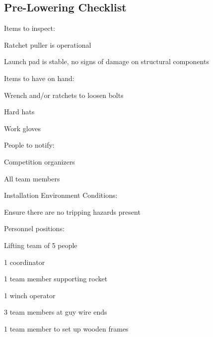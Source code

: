 \subsection{Pre-Lowering Checklist}
\begin{checklist}

\item Items to inspect:
\begin{checklist}
\item Ratchet puller is operational
\item Launch pad is stable, no signs of damage on structural components
\end{checklist}

\item Items to have on hand:
\begin{checklist}
\item Wrench and/or ratchets to loosen bolts
\item Hard hats
\item Work gloves
\end{checklist}

\item People to notify:
\begin{checklist}
\item Competition organizers
\item All team members
\end{checklist}

\item Installation Environment Conditions:
\begin{checklist}
\item Ensure there are no tripping hazards present
\end{checklist}

\item Personnel positions:
\begin{checklist}
\item Lifting team of 5 people
\item 1 coordinator
\item 1 team member supporting rocket
\item 1 winch operator
\item 3 team members at guy wire ends
\item 1 team member to set up wooden frames
\end{checklist}

\end{checklist}

